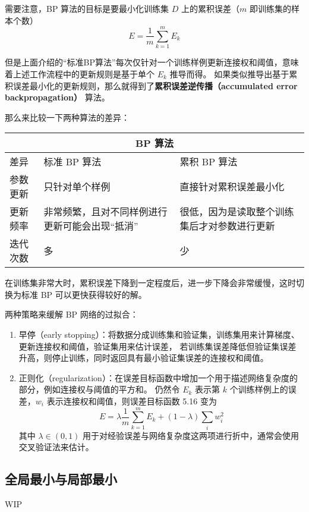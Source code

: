 \documentclass[../studies-ml.tex]{subfiles}
\begin{document}
需要注意，BP 算法的目标是要最小化训练集 $D$ 上的累积误差（$m$ 即训练集的样本个数）
\begin{equation}
  E = \frac{1}{m} \sum_{k=1}^{m} E_k
\end{equation}

但是上面介绍的“标准BP算法”每次仅针对一个训练样例更新连接权和阈值，意味着上述工作流程中的更新规则是基于单个 $E_k$ 推导而得。
如果类似推导出基于累积误差最小化的更新规则，那么就得到了\textbf{累积误差逆传播（accumulated error backpropagation）}
算法。

那么来比较一下两种算法的差异：

\begin{center}
  \begin{tabular}{ |p{2cm}||p{5cm}|p{5cm}|  }
    \hline
    \multicolumn{3}{|c|}{\textbf{BP 算法}}                     \\
    \hline
    差异   & 标准 BP 算法                 & 累积 BP 算法               \\
    \hline
    参数更新 & 只针对单个样例                  & 直接针对累积误差最小化            \\
    \hline
    更新频率 & 非常频繁，且对不同样例进行更新可能会出现“抵消” & 很低，因为是读取整个训练集后才对参数进行更新 \\
    \hline
    迭代次数 & 多                        & 少                      \\
    \hline
  \end{tabular}
\end{center}

在训练集非常大时，累积误差下降到一定程度后，进一步下降会非常缓慢，这时切换为标准 BP 可以更快获得较好的解。

两种策略来缓解 BP 网络的过拟合：
\begin{enumerate}
  \item 早停（early stopping）：将数据分成训练集和验证集，训练集用来计算梯度、更新连接权和阈值，验证集用来估计误差，
        若训练集误差降低但验证集误差升高，则停止训练，同时返回具有最小验证集误差的连接权和阈值。
  \item 正则化（regularization）：在误差目标函数中增加一个用于描述网络复杂度的部分，例如连接权与阈值的平方和。
        仍然令 $E_k$ 表示第 $k$ 个训练样例上的误差，$w_i$ 表示连接权和阈值，则误差目标函数 5.16 变为
        \begin{equation}
          E = \lambda \frac{1}{m} \sum_{k=1}^{m} E_k + (1-\lambda) \sum_{i} w_i^2
        \end{equation}
        其中 $\lambda \in (0,1)$ 用于对经验误差与网络复杂度这两项进行折中，通常会使用交叉验证法来估计。
\end{enumerate}


\newpage
\subsection{全局最小与局部最小}

WIP
\end{document}
